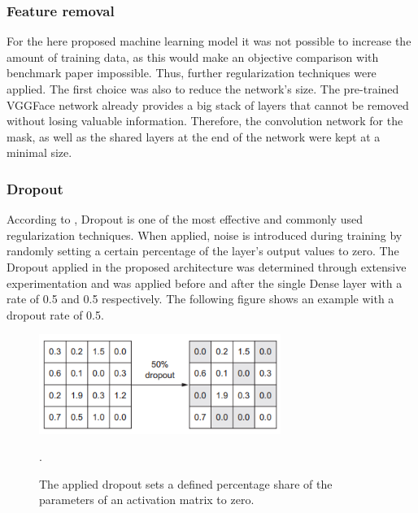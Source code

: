 \subsubsection{Feature removal}
For the here proposed machine learning model it was not possible to increase the amount of training data, as this would make an objective comparison with benchmark paper impossible. Thus, further regularization techniques were applied. The first choice was also to reduce the network's size. The pre-trained VGGFace network already provides a big stack of layers that cannot be removed without losing valuable information. Therefore, the convolution network for the mask, as well as the shared layers at the end of the network were kept at a minimal size.

\subsubsection{Dropout}
According to \citet{Chollet:2017:DeepLearningPython}, Dropout is one of the most effective and commonly used regularization techniques. When applied, noise is introduced during training by randomly setting a certain percentage of the layer's output values to zero. The Dropout applied in the proposed architecture was determined through extensive experimentation and was applied before and after the single Dense layer with a rate of 0.5 and 0.5 respectively. The following figure shows an example with a dropout rate of 0.5.

\begin{figure}[H]
  \begin{center}
  \includegraphics[angle=0, width=0.7\textwidth]{Figures/dropout.PNG}
  \caption{The applied dropout sets a defined percentage share of the parameters of an activation matrix to zero.\citep{Chollet:2017:DeepLearningPython}}.
  \label{fig:Dropout}
  \end{center}
\end{figure}

